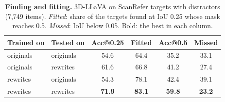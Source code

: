 \begin{table}[t]
\centering
\small
\setlength{\tabcolsep}{4pt}
\caption{\textbf{Finding and fitting.} 3D-LLaVA on ScanRefer targets with distractors (7,749 items). \emph{Fitted}: share of the targets found at IoU 0.25 whose mask reaches 0.5. \emph{Missed}: IoU below 0.05. Bold: the best in each column.}
\label{tab:supp_diag}
\begin{tabular}{@{}llcccc@{}}
\toprule
Trained on & Tested on & Acc@0.25 & Fitted & Acc@0.5 & Missed \\
\midrule
originals & originals & 54.6 & 64.4 & 35.2 & 33.1 \\
originals & rewrites  & 61.6 & 66.8 & 41.2 & 27.4 \\
rewrites  & originals & 54.3 & 78.1 & 42.4 & 39.1 \\
rewrites  & rewrites  & \textbf{71.9} & \textbf{83.1} & \textbf{59.8} & \textbf{23.2} \\
\bottomrule
\end{tabular}
\end{table}
